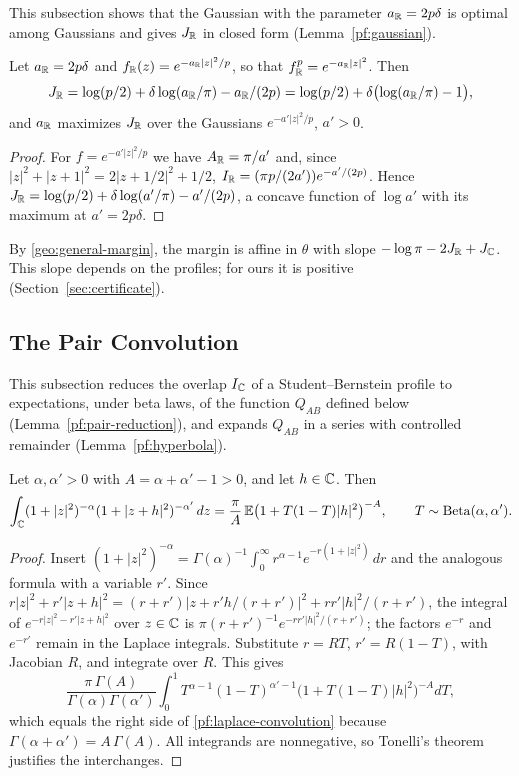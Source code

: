 This subsection shows that the Gaussian with the parameter $a_\mathbb R=2p\delta$ is
optimal among Gaussians and gives $J_\mathbb R$ in closed form
(Lemma~\ref{pf:gaussian}).

\begin{lemma}\label{pf:gaussian}
Let $a_\mathbb R=2p\delta$ and $f_\mathbb R(z)=e^{-a_\mathbb R|z|^2/p}$, so that
$f_\mathbb R^p=e^{-a_\mathbb R|z|^2}$. Then
\begin{equation}\label{pf:gaussian-compact}
 J_\mathbb R=\log(p/2)+\delta\log(a_\mathbb R/\pi)-a_\mathbb R/(2p)
 =\log(p/2)+\delta\bigl(\log(a_\mathbb R/\pi)-1\bigr),
\end{equation}
and $a_\mathbb R$ maximizes $J_\mathbb R$ over the Gaussians $e^{-a'|z|^2/p}$, $a'>0$.
\end{lemma}

\begin{proof}
For $f=e^{-a'|z|^2/p}$ we have $A_\mathbb R=\pi/a'$ and, since
$|z|^2+|z+1|^2=2|z+1/2|^2+1/2$, $I_\mathbb R=(\pi p/(2a'))e^{-a'/(2p)}$. Hence
$J_\mathbb R=\log(p/2)+\delta\log(a'/\pi)-a'/(2p)$, a concave function of
$\log a'$ with its maximum at $a'=2p\delta$.
\end{proof}

By \eqref{geo:general-margin}, the margin is affine in $\theta$ with
slope $-\log\pi-2J_\mathbb R+J_\mathbb C$. This slope depends on the profiles; for
ours it is positive (Section~\ref{sec:certificate}).

\subsection{The Pair Convolution}

This subsection reduces the overlap $I_\mathbb C$ of a Student--Bernstein profile to
expectations, under beta laws, of the function $Q_{AB}$ defined below
(Lemma~\ref{pf:pair-reduction}), and expands $Q_{AB}$ in a series with
controlled remainder (Lemma~\ref{pf:hyperbola}).

\begin{lemma}\label{pf:laplace}
Let $\alpha,\alpha'>0$ with $A=\alpha+\alpha'-1>0$, and let $h\in\mathbb C$.
Then
\begin{equation}\label{pf:laplace-convolution}
 \int_{\mathbb C}(1+|z|^2)^{-\alpha}(1+|z+h|^2)^{-\alpha'}\,dz
 =\frac\pi A\,\mathbb E\bigl(1+T(1-T)|h|^2\bigr)^{-A},
 \qquad T\sim\mathrm{Beta}(\alpha,\alpha').
\end{equation}
\end{lemma}

\begin{proof}
Insert
$(1+|z|^2)^{-\alpha}=\Gamma(\alpha)^{-1}\int_0^\infty
r^{\alpha-1}e^{-r(1+|z|^2)}\,dr$ and the analogous formula with a
variable $r'$. Since
$r|z|^2+r'|z+h|^2=(r+r')|z+r'h/(r+r')|^2+rr'|h|^2/(r+r')$, the
integral of $e^{-r|z|^2-r'|z+h|^2}$ over $z\in\mathbb C$ is
$\pi(r+r')^{-1}e^{-rr'|h|^2/(r+r')}$; the factors $e^{-r}$ and
$e^{-r'}$ remain in the Laplace integrals. Substitute $r=RT$,
$r'=R(1-T)$, with Jacobian $R$, and integrate over $R$. This gives
\[
 \frac{\pi\,\Gamma(A)}{\Gamma(\alpha)\Gamma(\alpha')}
 \int_0^1T^{\alpha-1}(1-T)^{\alpha'-1}\bigl(1+T(1-T)|h|^2\bigr)^{-A}dT,
\]
which equals the right side of \eqref{pf:laplace-convolution} because
$\Gamma(\alpha+\alpha')=A\,\Gamma(A)$. All integrands are nonnegative,
so Tonelli's theorem justifies the interchanges.
\end{proof}

